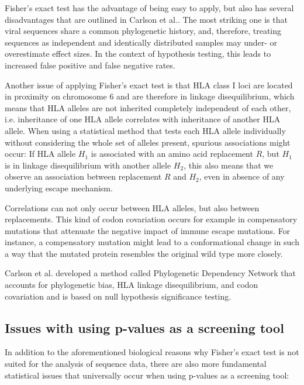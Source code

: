 \documentclass[fleqn,11pt]{SelfArx} %
\begin{document}
Fisher's exact test has the advantage of being easy to apply\nolinebreak\cite{Budeus2016},  but also has several disadvantages that are outlined in Carlson et al.\nolinebreak\cite{Carlson2008}. The most striking one is that viral sequences share a common phylogenetic history, and,  therefore, treating sequences as independent and identically distributed samples may under- or overestimate effect sizes. In the context of hypothesis testing, this leads to increased false positive and false negative rates. 

Another issue of applying Fisher's exact test is that HLA class I loci are located in proximity on chromosome 6 and are therefore in linkage disequilibrium, which means that HLA alleles are not inherited completely independent of each other, i.e. inheritance of one HLA allele correlates with inheritance of another HLA allele. When using a statistical method that tests each HLA allele individually without considering the whole set of alleles present, spurious associations might occur: If HLA allele \(H_{1}\) is associated with an amino acid replacement \(R\), but \(H_{1}\) is in linkage disequilibrium with another allele \(H_{2}\), this also means that we observe an association between replacement \(R\) and \(H_{2}\), even in absence of any underlying escape mechanism.

Correlations can not only occur between HLA alleles, but also between replacements. This kind of codon covariation occurs for example in compensatory mutations that attenuate the negative impact of immune escape mutations. For instance, a compensatory mutation might lead to a conformational change in such a way that the mutated protein resembles the original wild type more closely.

Carlson et al. \nolinebreak\cite{Carlson2008} developed a method called  Phylogenetic Dependency Network that accounts for phylogenetic bias,  HLA linkage disequilibrium, and codon covariation and is based on null hypothesis significance testing.

\subsection{Issues with using p-values as a screening tool}

In addition to the aforementioned biological reasons why Fisher's exact test is  not suited for the analysis of sequence data, there are also more fundamental statistical issues that universally occur when using p-values as a screening tool\nolinebreak\cite{Amrhein2017}:
\end{document}
